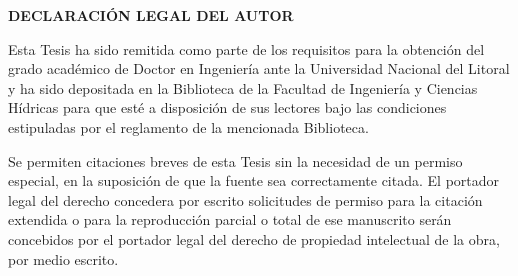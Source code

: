 \newpage
\thispagestyle{empty}
\vspace*{3em}
{\hfill\large \textbf{DECLARACIÓN LEGAL DEL AUTOR}\hfill\mbox{}}
\vspace{1em}

Esta Tesis ha sido remitida como parte de los requisitos para la obtención del grado académico de Doctor en Ingeniería ante la Universidad Nacional del Litoral
y ha sido depositada en la Biblioteca de la Facultad de Ingeniería y Ciencias Hídricas para que esté a disposición de sus lectores bajo las condiciones
estipuladas por el reglamento de la mencionada Biblioteca.

Se permiten citaciones breves de esta Tesis sin la necesidad de un permiso especial, en la suposición de que la fuente sea correctamente citada. El portador
legal del derecho concedera por escrito solicitudes de permiso para la citación extendida o para la reproducción parcial o total de ese manuscrito serán
concebidos por el portador legal del derecho de propiedad intelectual de la obra, por medio escrito.
